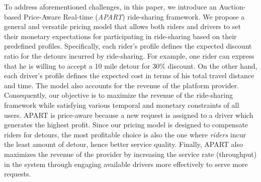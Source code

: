 


To address aforementioned challenges, in this paper, we introduce an Auction-based Price-Aware Real-time (\textit{APART}) ride-sharing framework. We propose a general and versatile pricing model that allows both riders and drivers to set their monetary expectations for participating in ride-sharing based on their predefined profiles. Specifically, each rider's profile defines the expected discount ratio for the detours incurred by ride-sharing. For example, one rider can express that he is willing to accept a 10 mile detour for 30\% discount. On the other hand, each driver's profile defines the expected cost in terms of his total travel distance and time. The model also accounts for the revenue of the platform provider. Consequently, our objective is to maximize the revenue of the ride-sharing framework while satisfying various temporal and monetary constraints of all users. APART is price-aware because a new request is assigned to a driver which generates the highest profit. Since our pricing model is designed to compensate riders for detours, the most profitable choice is also the one where \textit{riders} incur the least amount of detour, hence better service quality. Finally, APART also maximizes the revenue of the provider by increasing the service rate (throughput) in the system through engaging available drivers more effectively to serve more requests.



